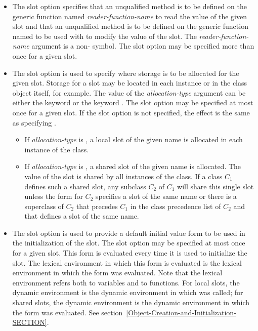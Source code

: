 \begin{defmac}
\begin{itemize}
\item  
The  slot option specifies that an unqualified method
is to be defined on the generic function named \emph{reader-function-name} to
read the value of the given slot 
and that an unqualified method is to be defined on the generic
function named  to be
used with  to modify the value of the slot.  The
\emph{reader-function-name} argument is a non- symbol. 
The  slot option may be specified more than once for a
given slot.

\item  
The  slot option is used to specify where storage is
to be allocated for the given slot.  Storage for a slot may be located
in each instance or in the class object itself, for example.  The value of the
\emph{allocation-type} argument can be either the keyword  
or the keyword .  The  slot option may be
specified at most once for a given slot.  If the 
slot option is not specified, the effect is the same as specifying
.

\begin{itemize}
\item
If \emph{allocation-type} is , a local slot of the given name
is allocated in each instance of the class.  

\item
If \emph{allocation-type} is , a shared slot of the given
name is allocated.  The value of the slot is shared by all instances of the class.
If a class $C_1$ defines such a shared slot, any subclass $C_2$ of
$C_1$ will share this single slot unless the  form
for $C_2$ specifies a slot of the same name or there is a
superclass of $C_2$ that precedes $C_1$ in the class precedence
list of $C_2$ and that defines a slot of the same name.
\end{itemize}

\item
The  slot option is used to provide a default
initial value form to be used in the initialization of the slot.  The
 slot option may be specified at most once for a given
slot.  This form is evaluated every time it is used to initialize the
slot.  The lexical
environment in which this form is evaluated is the lexical environment
in which the  form was evaluated.  Note that the lexical
environment refers both to variables and to functions.  For local
slots, the dynamic environment is the dynamic environment in which
 was called; for shared slots, the dynamic
environment is the dynamic environment in which the 
form was evaluated.  See section~\ref{Object-Creation-and-Initialization-SECTION}.


\end{itemize}
\end{defmac}
